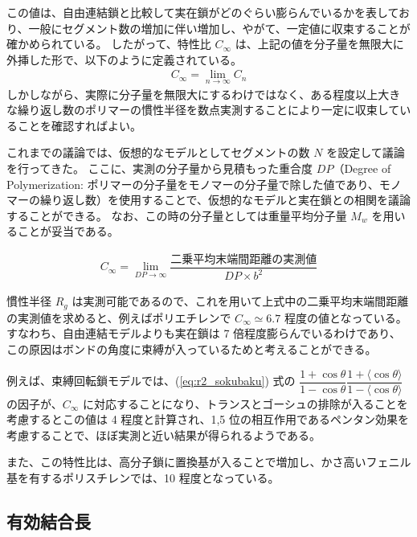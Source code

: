 \documentclass[uplatex,dvipdfmx,a4paper,11pt, titlepage]{jsarticle}
\begin{document}
この値は、自由連結鎖と比較して実在鎖がどのぐらい膨らんでいるかを表しており、一般にセグメント数の増加に伴い増加し、やがて、一定値に収束することが確かめられている。
したがって、特性比 $C_{\infty}$ は、上記の値を分子量を無限大に外挿した形で、以下のように定義されている。
\begin{align}
C_{\infty}=\lim_{n \to \infty} C_n 
\label{fig:CR}
\end{align}
しかしながら、実際に分子量を無限大にするわけではなく、ある程度以上大きな繰り返し数のポリマーの慣性半径を数点実測することにより一定に収束していることを確認すればよい。

これまでの議論では、仮想的なモデルとしてセグメントの数 $N$ を設定して議論を行ってきた。
ここに、実測の分子量から見積もった重合度 $DP$（Degree of Polymerization: ポリマーの分子量をモノマーの分子量で除した値であり、モノマーの繰り返し数）を使用することで、仮想的なモデルと実在鎖との相関を議論することができる。
なお、この時の分子量としては重量平均分子量 $M_w$ を用いることが妥当である。

\begin{align}
C_{\infty} = \lim_{DP \to \infty} \dfrac{ \text{二乗平均末端間距離の実測値} }{DP \times b^2}
\label{fig:CR}
\end{align}

慣性半径 $R_g$ は実測可能であるので、これを用いて上式中の二乗平均末端間距離の実測値を求めると、例えばポリエチレンで $C_{\infty} \simeq 6.7$ 程度の値となっている。
すなわち、自由連結モデルよりも実在鎖は 7 倍程度膨らんでいるわけであり、この原因はボンドの角度に束縛が入っているためと考えることができる。

例えば、束縛回転鎖モデルでは、(\ref{eq:r2_sokubaku}) 式の $\dfrac{1+\cos \theta}{1-\cos \theta} \dfrac{1+ \langle \cos \theta \rangle}{1- \langle \cos \theta \rangle}$ の因子が、$C_{\infty}$ に対応することになり、トランスとゴーシュの排除が入ることを考慮するとこの値は 4 程度と計算され、1,5 位の相互作用であるペンタン効果を考慮することで、ほぼ実測と近い結果が得られるようである。

また、この特性比は、高分子鎖に置換基が入ることで増加し、かさ高いフェニル基を有するポリスチレンでは、10 程度となっている。



\subsection{有効結合長}
\end{document}
